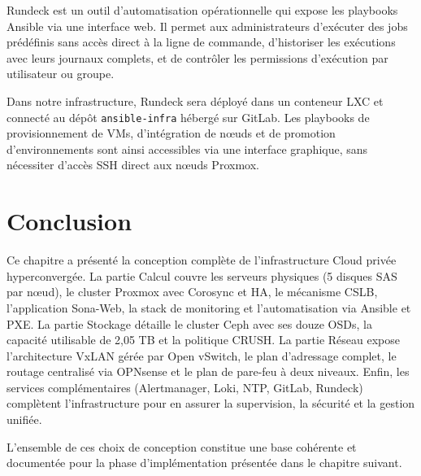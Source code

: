 \par Rundeck est un outil d'automatisation opérationnelle qui expose les playbooks Ansible via une interface web. Il permet aux administrateurs d'exécuter des jobs prédéfinis sans accès direct à la ligne de commande, d'historiser les exécutions avec leurs journaux complets, et de contrôler les permissions d'exécution par utilisateur ou groupe.

\par Dans notre infrastructure, Rundeck sera déployé dans un conteneur LXC et connecté au dépôt \texttt{ansible-infra} hébergé sur GitLab. Les playbooks de provisionnement de VMs, d'intégration de nœuds et de promotion d'environnements sont ainsi accessibles via une interface graphique, sans nécessiter d'accès SSH direct aux nœuds Proxmox.

\section{Conclusion}

\par Ce chapitre a présenté la conception complète de l'infrastructure Cloud privée hyperconvergée. La partie Calcul couvre les serveurs physiques (5 disques SAS par nœud), le cluster Proxmox avec Corosync et HA, le mécanisme CSLB, l'application Sona-Web, la stack de monitoring et l'automatisation via Ansible et PXE. La partie Stockage détaille le cluster Ceph avec ses douze OSDs, la capacité utilisable de 2,05 TB et la politique CRUSH. La partie Réseau expose l'architecture VxLAN gérée par Open vSwitch, le plan d'adressage complet, le routage centralisé via OPNsense et le plan de pare-feu à deux niveaux. Enfin, les services complémentaires (Alertmanager, Loki, NTP, GitLab, Rundeck) complètent l'infrastructure pour en assurer la supervision, la sécurité et la gestion unifiée.\\

\par L'ensemble de ces choix de conception constitue une base cohérente et documentée pour la phase d'implémentation présentée dans le chapitre suivant.\\
